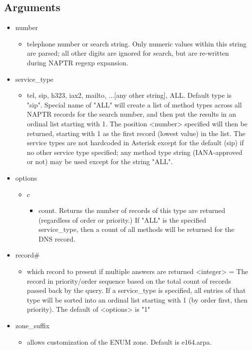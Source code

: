\subsection{Arguments}

\begin{itemize}
  \item number
  \begin{itemize}
    \item telephone number or search string.  Only numeric values
    within this string are parsed; all other digits are ignored for
    search, but are re-written during NAPTR regexp expansion.
  \end{itemize}

  \item service\_type
  \begin{itemize} 
     \item tel, sip, h323, iax2, mailto, ...[any other string],
     ALL. Default type is "sip".
     Special name of "ALL" will create a list of method types across
     all NAPTR records for the search number, and then put the results
     in an ordinal list starting with 1. The position <number>
     specified will then be returned, starting with 1 as the first
     record (lowest value) in the list.  The service types are not
     hardcoded in Asterisk except for the default (sip) if no other
     service type specified; any method type string (IANA-approved or
     not) may be used except for the string "ALL".  
  \end{itemize}

  \item options
  \begin{itemize}
    \item c
    \begin{itemize}
      \item count. Returns the number of records of this type are returned
    (regardless of order or priority.)  If "ALL" is the specified
    service\_type, then a count of all methods will be returned for the
    DNS record.
    \end{itemize}
  \end{itemize}

  \item record\# 
  \begin{itemize}
    \item which record to present if multiple answers are returned
    <integer> = The record in priority/order sequence based on the
    total count of records passed back by the query. If a service\_type
    is specified, all entries of that type will be sorted into an
    ordinal list starting with 1 (by order first, then priority).
    The default of <options> is "1"
  \end{itemize}

  \item zone\_suffix
  \begin{itemize}
    \item allows customization of the ENUM zone. Default is e164.arpa.
  \end{itemize}
\end{itemize}


